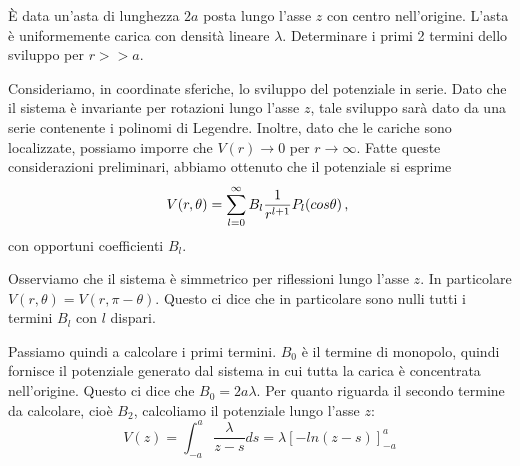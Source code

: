 \documentclass[../main.tex]{subfiles}
\begin{document}

\textex

È data un'asta di lunghezza $2a$ posta lungo l'asse $z$ con centro nell'origine. L'asta è uniformemente carica con densità lineare $\lambda$. Determinare i primi 2 termini dello sviluppo per $r>>a$.

\solution

Consideriamo, in coordinate sferiche, lo sviluppo del potenziale in serie. Dato che il sistema è invariante per rotazioni lungo l'asse $z$, tale sviluppo sarà dato da una serie contenente i polinomi di Legendre. Inoltre, dato che le cariche sono localizzate, possiamo imporre che $V(r)\rightarrow 0$ per $r\rightarrow \infty$. Fatte queste considerazioni preliminari, abbiamo ottenuto che il potenziale si esprime
\[
	V(r,\theta)=\sum_{l=0}^{\infty} B_l\frac{1}{r^{l+1}}P_l(cos \theta)\, \text{, }
\]
con opportuni coefficienti $B_l$.

Osserviamo che il sistema è simmetrico per riflessioni lungo l'asse $z$. In particolare $V(r,\theta)=V(r,\pi-\theta)$. Questo ci dice che in particolare sono nulli tutti i termini $B_l$ con $l$ dispari.

Passiamo quindi a calcolare i primi termini. $B_0$ è il termine di monopolo, quindi fornisce il potenziale generato dal sistema in cui tutta la carica è concentrata nell'origine. Questo ci dice che $B_0=2a\lambda$. Per quanto riguarda il secondo termine da calcolare, cioè $B_2$, calcoliamo il potenziale lungo l'asse $z$:
\[
	V(z)=\int_{-a}^a \frac{\lambda}{z-s}ds=\lambda [-ln(z-s)]_{-a}^a
\]
\end{document}
